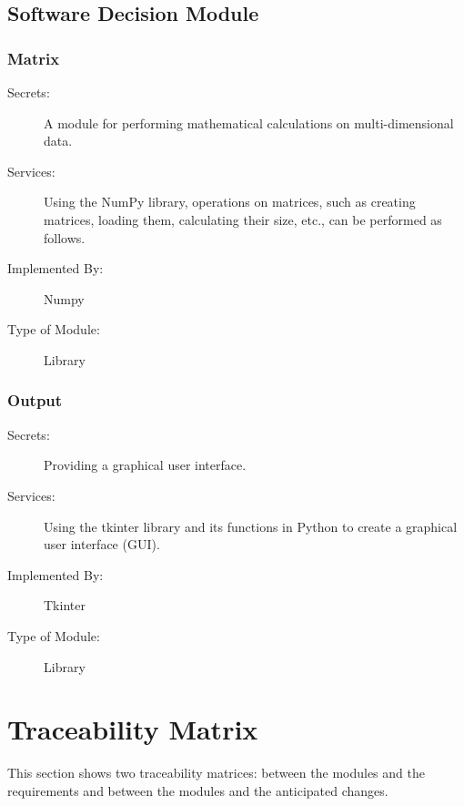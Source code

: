 \documentclass[12pt, titlepage]{article}
\begin{document}
\subsection{Software Decision Module}

\subsubsection{Matrix}
\begin{description}
\item[Secrets:] A module for performing mathematical calculations on multi-dimensional data.
\item[Services:] Using the NumPy library, operations on matrices, such as creating matrices, loading them, calculating their size, etc., can be performed as follows.
\item[Implemented By:] Numpy
\item[Type of Module:] Library
\end{description}

\subsubsection{Output}
\begin{description}
\item[Secrets:] Providing a graphical user interface.
\item[Services:] Using the tkinter library and its functions in Python to create a graphical user interface (GUI).
\item[Implemented By:] Tkinter
\item[Type of Module:] Library
\end{description}
\section{Traceability Matrix} \label{SecTM}

This section shows two traceability matrices: between the modules and the
requirements and between the modules and the anticipated changes.
\end{document}
